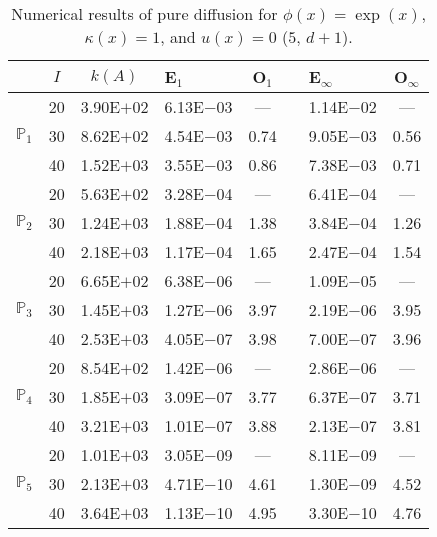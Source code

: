 \begin{table}[H]
\centering
\caption{Numerical results of pure diffusion for $\phi(x)=\exp(x)$, $\kappa(x)=1$, and $u(x)=0$ ($5,\,d+1$).}
\begin{tabular}{@{}l c c l c c l c@{}}
\toprule
 & $I$ & $k(A)$ & E$_1$ & O$_1$ && E$_{\infty}$ & O$_{\infty}$\\
\midrule
\multirow{3}{*}{$\mathbb{P}_{1}$}
 & 20 & 3.90E$+$02 & 6.13E$-$03 & --- && 1.14E$-$02 & ---\\
 & 30 & 8.62E$+$02 & 4.54E$-$03 & 0.74 && 9.05E$-$03 & 0.56\\
 & 40 & 1.52E$+$03 & 3.55E$-$03 & 0.86 && 7.38E$-$03 & 0.71\\
\midrule
\multirow{3}{*}{$\mathbb{P}_{2}$}
 & 20 & 5.63E$+$02 & 3.28E$-$04 & --- && 6.41E$-$04 & ---\\
 & 30 & 1.24E$+$03 & 1.88E$-$04 & 1.38 && 3.84E$-$04 & 1.26\\
 & 40 & 2.18E$+$03 & 1.17E$-$04 & 1.65 && 2.47E$-$04 & 1.54\\
\midrule
\multirow{3}{*}{$\mathbb{P}_{3}$}
 & 20 & 6.65E$+$02 & 6.38E$-$06 & --- && 1.09E$-$05 & ---\\
 & 30 & 1.45E$+$03 & 1.27E$-$06 & 3.97 && 2.19E$-$06 & 3.95\\
 & 40 & 2.53E$+$03 & 4.05E$-$07 & 3.98 && 7.00E$-$07 & 3.96\\
\midrule
\multirow{3}{*}{$\mathbb{P}_{4}$}
 & 20 & 8.54E$+$02 & 1.42E$-$06 & --- && 2.86E$-$06 & ---\\
 & 30 & 1.85E$+$03 & 3.09E$-$07 & 3.77 && 6.37E$-$07 & 3.71\\
 & 40 & 3.21E$+$03 & 1.01E$-$07 & 3.88 && 2.13E$-$07 & 3.81\\
\midrule
\multirow{3}{*}{$\mathbb{P}_{5}$}
 & 20 & 1.01E$+$03 & 3.05E$-$09 & --- && 8.11E$-$09 & ---\\
 & 30 & 2.13E$+$03 & 4.71E$-$10 & 4.61 && 1.30E$-$09 & 4.52\\
 & 40 & 3.64E$+$03 & 1.13E$-$10 & 4.95 && 3.30E$-$10 & 4.76\\
\bottomrule
\end{tabular}
\end{table}